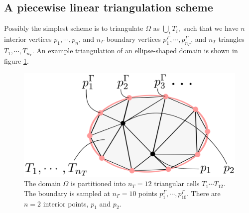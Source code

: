 \subsection{A piecewise linear triangulation scheme}
Possibly the simplest scheme is to triangulate $\Omega$ as
    $\bigcup_i T_i,$
such that we have $n$ interior vertices $p_1,\cdots,p_n$, and $n_\Gamma$ boundary vertices $p^\Gamma_1,\cdots,p^\Gamma_{n_\Gamma}$, and $n_T$ triangles
$T_1,\cdots,T_{n_T}$. An example triangulation of an ellipse-shaped domain is shown in figure \ref{triangulation}.
\begin{figure}[H]
    \begin{center}
        \includegraphics[width=0.53\linewidth]{figures/triangulation/triangulation.png}
    \end{center}
    \caption{\scriptsize
        The domain $\Omega$ is partitioned into $n_T = 12$ triangular cells $T_1\cdots T_{12}$. The boundary is sampled at $n_\Gamma = 10$ points
        $p^\Gamma_1,\cdots,p^\Gamma_{10}$.
        There are $n = 2$ interior points, $p_1$ and $p_2$.
    }
    \label{triangulation}
\end{figure}

